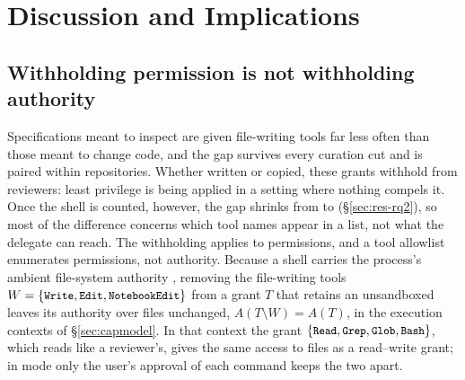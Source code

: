 
\section{Discussion and Implications}
\label{sec:discussion}

\subsection{Withholding permission is not withholding authority}
\label{sec:disc-leastpriv}

Specifications meant to inspect are given file-writing tools far less often than those meant to change code, and the
gap survives every curation cut and is paired within repositories. Whether written or copied, these grants withhold
 from reviewers: least privilege is being applied in a setting where nothing compels it. Once the shell is
counted, however, the gap shrinks from \RQtwoRoleGapWrite{} to \RQtwoRoleGapAuthority{} (\S\ref{sec:res-rq2}), so most
of the difference concerns which tool names appear in a list, not what the delegate can reach. The withholding applies
to permissions, and a tool allowlist enumerates permissions,
not authority. Because a shell carries the process's ambient file-system authority \citep{miller2003capability},
removing the file-writing tools $W=\{\texttt{\small Write},\texttt{\small Edit},\texttt{\small NotebookEdit}\}$ from a grant $T$ that retains an
unsandboxed  leaves its authority over files unchanged, $A(T \setminus W) = A(T)$, in the execution contexts
of \S\ref{sec:capmodel}. In that context the grant $\{\texttt{\small Read}, \texttt{\small Grep}, \texttt{\small Glob}, \texttt{\small Bash}\}$, which reads like a reviewer's,
gives the same access to files as a read--write grant; in  mode only the user's approval of each command
keeps the two apart.


